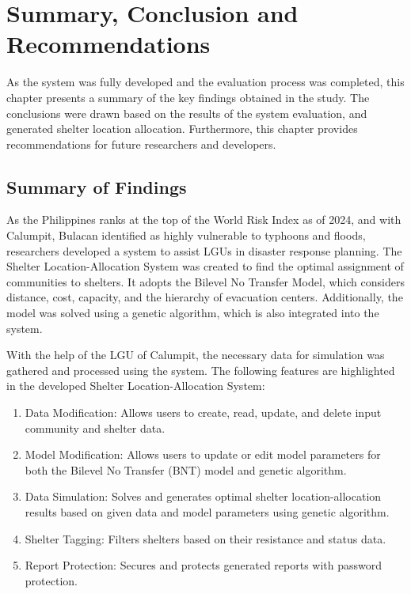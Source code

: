 \chapter{Summary, Conclusion and Recommendations}
	As the system was fully developed and the evaluation process was completed, this chapter presents a summary of the key findings obtained in the study. The conclusions were drawn based on the results of the system evaluation, and generated shelter location allocation. Furthermore, this chapter provides recommendations for future researchers and developers.

\section{Summary of Findings}
	As the Philippines ranks at the top of the World Risk Index as of 2024, and with Calumpit, Bulacan identified as highly vulnerable to typhoons and floods, researchers developed a system to assist LGUs in disaster response planning. The Shelter Location-Allocation System was created to find the optimal assignment of communities to shelters. It adopts the Bilevel No Transfer Model, which considers distance, cost, capacity, and the hierarchy of evacuation centers. Additionally, the model was solved using a genetic algorithm, which is also integrated into the system.
	
	With the help of the LGU of Calumpit, the necessary data for simulation was gathered and processed using the system. The following features are highlighted in the developed Shelter Location-Allocation System:
	
	\begin{enumerate}
		\item Data Modification: Allows users to create, read, update, and delete input community and shelter data.
		\item Model Modification: Allows users to update or edit model parameters for both the Bilevel No Transfer (BNT) model and genetic algorithm.
		\item Data Simulation: Solves and generates optimal shelter location-allocation results based on given data and model parameters using genetic algorithm.
		\item Shelter Tagging: Filters shelters based on their resistance and status data.
		\item Report Protection: Secures and protects generated reports with password protection.
	\end{enumerate}
	
